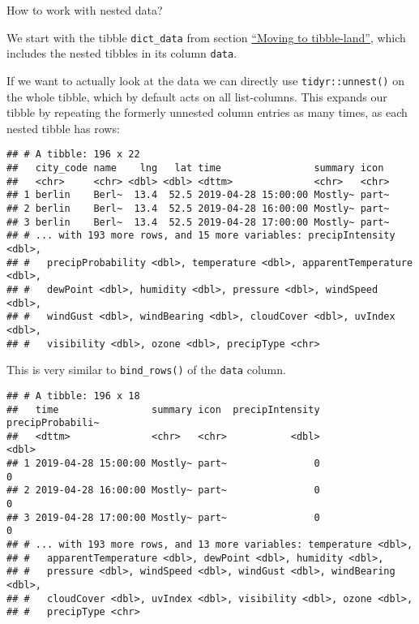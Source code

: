 \documentclass[]{book}
\newenvironment{Shaded}{\begin{snugshade}}{\end{snugshade}}
\newcommand{\KeywordTok}[1]{\textcolor[rgb]{0.13,0.29,0.53}{\textbf{#1}}}
\newcommand{\NormalTok}[1]{#1}
\newcommand{\OperatorTok}[1]{\textcolor[rgb]{0.81,0.36,0.00}{\textbf{#1}}}
\newcommand{\StringTok}[1]{\textcolor[rgb]{0.31,0.60,0.02}{#1}}
\begin{document}
How to work with nested data?

We start with the tibble \texttt{dict\_data} from section \protect\hyperlink{mut_map}{``Moving to tibble-land''}, which includes the nested tibbles in its column \texttt{data}.

If we want to actually look at the data we can directly use \texttt{tidyr::unnest()} on the whole tibble, which by default acts on all list-columns.
This expands our tibble by repeating the formerly unnested column entries as many times, as each nested tibble has rows:

\begin{Shaded}
\end{Shaded}

\begin{verbatim}
## # A tibble: 196 x 22
##   city_code name    lng   lat time                summary icon 
##   <chr>     <chr> <dbl> <dbl> <dttm>              <chr>   <chr>
## 1 berlin    Berl~  13.4  52.5 2019-04-28 15:00:00 Mostly~ part~
## 2 berlin    Berl~  13.4  52.5 2019-04-28 16:00:00 Mostly~ part~
## 3 berlin    Berl~  13.4  52.5 2019-04-28 17:00:00 Mostly~ part~
## # ... with 193 more rows, and 15 more variables: precipIntensity <dbl>,
## #   precipProbability <dbl>, temperature <dbl>, apparentTemperature <dbl>,
## #   dewPoint <dbl>, humidity <dbl>, pressure <dbl>, windSpeed <dbl>,
## #   windGust <dbl>, windBearing <dbl>, cloudCover <dbl>, uvIndex <dbl>,
## #   visibility <dbl>, ozone <dbl>, precipType <chr>
\end{verbatim}

This is very similar to \texttt{bind\_rows()} of the \texttt{data} column.

\begin{Shaded}
\end{Shaded}

\begin{verbatim}
## # A tibble: 196 x 18
##   time                summary icon  precipIntensity precipProbabili~
##   <dttm>              <chr>   <chr>           <dbl>            <dbl>
## 1 2019-04-28 15:00:00 Mostly~ part~               0                0
## 2 2019-04-28 16:00:00 Mostly~ part~               0                0
## 3 2019-04-28 17:00:00 Mostly~ part~               0                0
## # ... with 193 more rows, and 13 more variables: temperature <dbl>,
## #   apparentTemperature <dbl>, dewPoint <dbl>, humidity <dbl>,
## #   pressure <dbl>, windSpeed <dbl>, windGust <dbl>, windBearing <dbl>,
## #   cloudCover <dbl>, uvIndex <dbl>, visibility <dbl>, ozone <dbl>,
## #   precipType <chr>
\end{verbatim}
\end{document}
